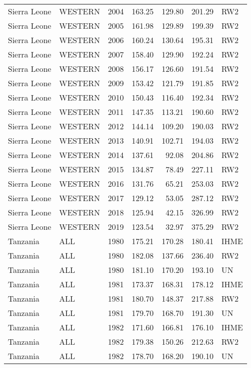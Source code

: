\begin{longtable}{lllrrrl}
  Sierra Leone & WESTERN & 2004 & 163.25 & 129.80 & 201.29 & RW2 \\ 
  Sierra Leone & WESTERN & 2005 & 161.98 & 129.89 & 199.39 & RW2 \\ 
  Sierra Leone & WESTERN & 2006 & 160.24 & 130.64 & 195.31 & RW2 \\ 
  Sierra Leone & WESTERN & 2007 & 158.40 & 129.90 & 192.24 & RW2 \\ 
  Sierra Leone & WESTERN & 2008 & 156.17 & 126.60 & 191.54 & RW2 \\ 
  Sierra Leone & WESTERN & 2009 & 153.42 & 121.79 & 191.85 & RW2 \\ 
  Sierra Leone & WESTERN & 2010 & 150.43 & 116.40 & 192.34 & RW2 \\ 
  Sierra Leone & WESTERN & 2011 & 147.35 & 113.21 & 190.60 & RW2 \\ 
  Sierra Leone & WESTERN & 2012 & 144.14 & 109.20 & 190.03 & RW2 \\ 
  Sierra Leone & WESTERN & 2013 & 140.91 & 102.71 & 194.03 & RW2 \\ 
  Sierra Leone & WESTERN & 2014 & 137.61 & 92.08 & 204.86 & RW2 \\ 
  Sierra Leone & WESTERN & 2015 & 134.87 & 78.49 & 227.11 & RW2 \\ 
  Sierra Leone & WESTERN & 2016 & 131.76 & 65.21 & 253.03 & RW2 \\ 
  Sierra Leone & WESTERN & 2017 & 129.12 & 53.05 & 287.12 & RW2 \\ 
  Sierra Leone & WESTERN & 2018 & 125.94 & 42.15 & 326.99 & RW2 \\ 
  Sierra Leone & WESTERN & 2019 & 123.54 & 32.97 & 375.29 & RW2 \\ 
  Tanzania & ALL & 1980 & 175.21 & 170.28 & 180.41 & IHME \\ 
  Tanzania & ALL & 1980 & 182.08 & 137.66 & 236.40 & RW2 \\ 
  Tanzania & ALL & 1980 & 181.10 & 170.20 & 193.10 & UN \\ 
  Tanzania & ALL & 1981 & 173.37 & 168.31 & 178.12 & IHME \\ 
  Tanzania & ALL & 1981 & 180.70 & 148.37 & 217.88 & RW2 \\ 
  Tanzania & ALL & 1981 & 179.70 & 168.70 & 191.30 & UN \\ 
  Tanzania & ALL & 1982 & 171.60 & 166.81 & 176.10 & IHME \\ 
  Tanzania & ALL & 1982 & 179.38 & 150.26 & 212.63 & RW2 \\ 
  Tanzania & ALL & 1982 & 178.70 & 168.20 & 190.10 & UN \\ 

\end{longtable}
